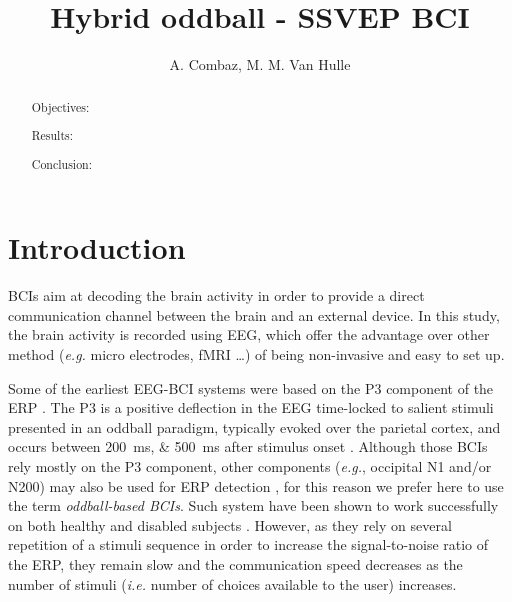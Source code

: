 \documentclass[10pt]{article}
\title{Hybrid oddball - SSVEP BCI}
\author[ * ]{A. Combaz, M. M. Van Hulle}
\affil[ * ]{Computational Neuroscience Group, Laboratory for Neuro- and Psychophysiology, KU Leuven, Leuven, Belgium}
\makeatletter
\newcommand{\extraclearlabels}{\protected@write\@auxout{}{%
  \string\reset@newl@bel
}}
\makeatother
\begin{document}
\maketitle

\begin{abstract}
\extraclearlabels
Objectives:

Results:

Conclusion:
\end{abstract}


\acresetall

\section{Introduction}
\label{sec:1Intro}

\acp{BCI} aim at decoding the brain activity in order to provide a direct communication channel between the brain and an external device.
In this study, the brain activity is recorded using \ac{EEG}, which offer the advantage over other method (\emph{e.g.} micro electrodes, fMRI \ldots) of being non-invasive and easy to set up.

Some of the earliest \ac{EEG}-\ac{BCI} systems were based on the P3 component of the \ac{ERP} \parencite{Farwell1988, Donchin2000}.
The P3 is a positive deflection in the EEG time-locked to salient stimuli presented in an oddball paradigm, typically evoked over the parietal cortex, and occurs between \SIlist[list-units = single]{200;500}{\ms} after stimulus onset \parencite{Sutton1965}.
Although those \acp{BCI} rely mostly on the P3 component, other components (\emph{e.g.}, occipital N1 and/or N200) may also be used for ERP detection \parencite{Bianchi2010, Kaufmann2011}, for this reason we prefer here to use the term \emph{oddball-based \acp{BCI}}.
Such system have been shown to work successfully on both healthy and disabled subjects \parencite{Sellers2010, Krusienski2008, Combaz2013}.
However, as they rely on several repetition of a stimuli sequence in order to increase the signal-to-noise ratio of the \ac{ERP}, they remain slow and the communication speed decreases as the number of stimuli (\emph{i.e.} number of choices available to the user) increases.
\end{document}
